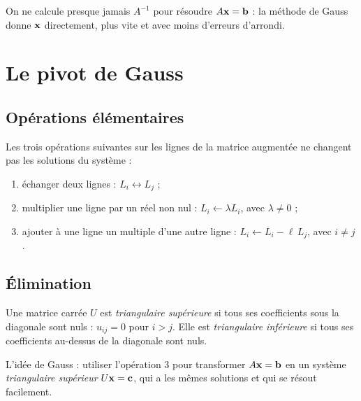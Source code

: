 \begin{importantbox}
On ne calcule presque jamais $A^{-1}$ pour résoudre
$A\mathbf{x} = \mathbf{b}$ : la méthode de Gauss donne
$\mathbf{x}$ directement, plus vite et avec moins
d'erreurs d'arrondi.
\end{importantbox}

\section{Le pivot de Gauss}

\subsection{Opérations élémentaires}

\begin{proposition}
Les trois opérations suivantes sur les lignes de la
matrice augmentée ne changent pas les solutions du
système :
\begin{enumerate}
    \item échanger deux lignes :
          $L_i \leftrightarrow L_j$ ;
    \item multiplier une ligne par un réel non nul :
          $L_i \leftarrow \lambda L_i$, avec
          $\lambda \neq 0$ ;
    \item ajouter à une ligne un multiple d'une autre
          ligne : $L_i \leftarrow L_i - \ell\, L_j$,
          avec $i \neq j$.
\end{enumerate}
\end{proposition}

\subsection{Élimination}
\label{sec-elimination}

\begin{definition}
Une matrice carrée $U$ est \emph{triangulaire
supérieure} si tous ses coefficients sous la
diagonale sont nuls : $u_{ij} = 0$ pour $i > j$. Elle
est \emph{triangulaire inférieure} si tous ses
coefficients au-dessus de la diagonale sont nuls.
\end{definition}

L'idée de Gauss : utiliser l'opération 3 pour
transformer $A\mathbf{x} = \mathbf{b}$ en un système
\emph{triangulaire supérieur} $U\mathbf{x} = \mathbf{c}$,
qui a les mêmes solutions et qui se résout facilement.

